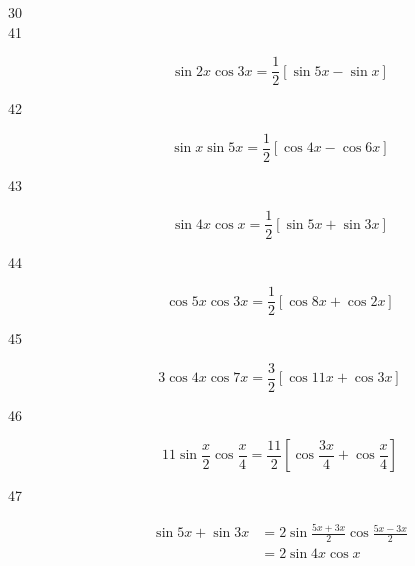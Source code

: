 \documentclass{exam}
\begin{document}
\begin{description}
\begin{parts}
          \part 
            \[
              \cos^2 5 \theta  - \sin^2 5 \theta = \boxed{ \cos 10 \theta }
            \]
        \end{parts}

      \item[30]
        \begin{parts}
          \part 
            \[
              \cos^2 \frac{\theta}{2}  - \sin^2 \frac{\theta}{2} = \boxed{ \cos \theta }
            \]

            \[
              2 \sin \frac{\theta}{2} \cos \frac{\theta}{2} = \boxed{ \sin \theta }
            \]
        \end{parts}

      \item[41]
        \[
          \sin 2x \cos 3x = \boxed{ \frac{1}{2} \left[ \sin 5x - \sin x \right] }
        \]

      \item[42]
        \[
          \sin x \sin 5x = \boxed{ \frac{1}{2} \left[ \cos 4x - \cos 6x \right] }
        \]

      \item[43]
        \[
          \sin 4x \cos x = \boxed{ \frac{1}{2} \left[ \sin 5x + \sin 3x \right] } 
        \]

      \item[44]
        \[
          \cos 5x \cos 3x = \boxed{ \frac{1}{2} \left[ \cos 8x + \cos 2x \right] } 
        \]

      \item[45]
        \[
          3 \cos 4x \cos 7x = \boxed{ \frac{3}{2} \left[ \cos 11x + \cos 3x \right] } 
        \]

      \item[46]
        \[
          11 \sin \frac{x}{2} \cos \frac{x}{4} = \boxed{ \frac{11}{2} \left[ \cos \frac{3x}{4} + \cos \frac{x}{4} \right] } 
        \]

      \item[47]
        \begin{align*}
          \sin 5x + \sin 3x & = 2 \sin \frac{5x + 3x}{2} \cos \frac{5x - 3x}{2} \\
                            & = \boxed{ 2 \sin 4x \cos x } \\
        \end{align*}


\end{description}
\end{document}
